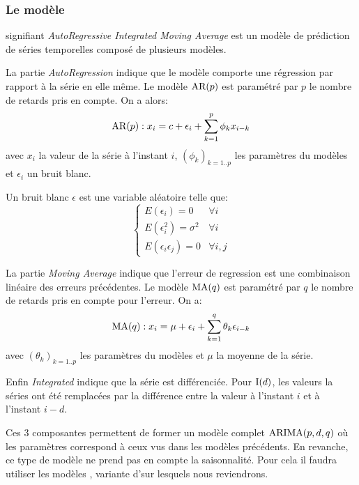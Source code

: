 \subsubsection{Le modèle \ARIMA}

\ARIMA signifiant \emph{AutoRegressive Integrated Moving Average} est un modèle de prédiction de séries temporelles composé de plusieurs modèles.

La partie \emph{AutoRegression} indique que le modèle comporte une régression par rapport à la série en elle même. Le modèle $\textrm{AR}(p)$ est paramétré par $p$ le nombre de retards pris en compte. On a alors:
\begin{equation}
    \textrm{AR}(p) : x_i = c + \epsilon_i + \sum_{k=1}^p \phi_k x_{i-k}
    \label{eq:ar}
\end{equation}
avec $x_i$ la valeur de la série à l'instant $i$, $(\phi_k)_{k=1..p}$ les paramètres du modèles et $\epsilon_i$ un bruit blanc.

Un bruit blanc $\epsilon$ est une variable aléatoire telle que:
\begin{equation}
    \begin{cases}
        E(\epsilon_i) = 0             & \forall i \\
        E(\epsilon_i^2) = \sigma^2    & \forall i \\
        E(\epsilon_i \epsilon_j) = 0  & \forall i, j
    \end{cases}
    \label{eq:white_noise}
\end{equation}

La partie \emph{Moving Average} indique que l'erreur de regression est une combinaison linéaire des erreurs précédentes. Le modèle $\textrm{MA}(q)$ est paramétré par $q$ le nombre de retards pris en compte pour l'erreur. On a:
\begin{equation}
    \textrm{MA}(q) : x_i = \mu + \epsilon_i + \sum_{k=1}^q \theta_k \epsilon_{i-k}
    \label{eq:ma}
\end{equation}
avec $(\theta_k)_{k=1..p}$ les paramètres du modèles et $\mu$ la moyenne de la série.

Enfin \emph{Integrated} indique que la série est différenciée. Pour $\textrm{I}(d)$, les valeurs la séries ont été remplacées par la différence entre la valeur à l'instant $i$ et à l'instant $i-d$.

Ces 3 composantes permettent de former un modèle complet $\textrm{ARIMA}(p,d,q)$ où les paramètres correspond à ceux vus dans les modèles précédents. En revanche, ce type de modèle ne prend pas en compte la saisonnalité. Pour cela il faudra utiliser les modèles \SARIMA, variante d'\ARIMA sur lesquels nous reviendrons.

